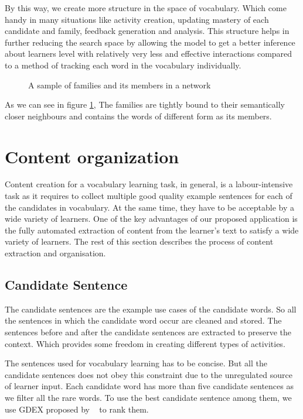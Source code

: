 \documentclass[11pt,a4paper]{article}
\begin{document}
By this way, we create more structure in the space of vocabulary. Which come handy in many situations like activity creation, updating mastery of each
candidate and family, feedback generation and analysis. This structure helps in further reducing the search space
by allowing the model to get a better inference about learners level with relatively very less and effective interactions compared to a method of
tracking each word in the vocabulary individually.

\begin{figure}[ht!]
\begin{tcbraster}[raster columns=1, enhanced, blankest]
\caption{A sample of families and its members in a network}
\label{fig:network}
\end{tcbraster}
\end{figure}

As we can see in figure \ref{fig:network}, The families are tightly bound to their semantically closer neighbours and contains the words of different form as its members.

\section{Content organization}
Content creation for a vocabulary learning task, in general, is a labour-intensive task as it requires to collect multiple good quality example sentences for each of the candidates in vocabulary. At the same time, they have to be acceptable by a wide variety of learners.
One of the key advantages of our proposed application is the fully automated extraction of content from the learner's text to satisfy a wide variety of learners. The rest of this section describes the process of content extraction and organisation.

\subsection{Candidate Sentence}
The candidate sentences are the example use cases of the candidate words. So all the sentences in which the candidate word occur are cleaned and stored. The sentences before and after the candidate sentences are extracted to preserve the context. Which provides some freedom in creating different types of activities.

The sentences used for vocabulary learning has to be concise. But all the candidate sentences does not obey this constraint due to the unregulated source of learner input. Each candidate word has more than five candidate sentences as we filter all the rare words. To use the best candidate sentence among them, we use GDEX proposed by ~\cite{kilgarriff2008gdex} to rank them.
\end{document}
